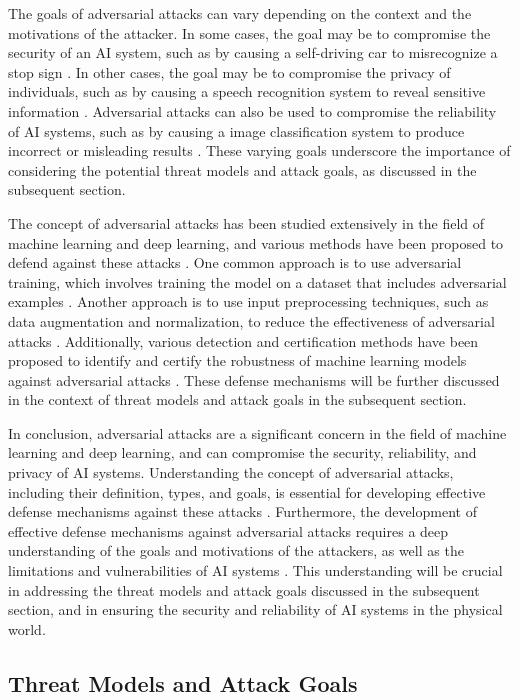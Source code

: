 \documentclass[11pt]{article}
\begin{document}
The goals of adversarial attacks can vary depending on the context and the motivations of the attacker. In some cases, the goal may be to compromise the security of an AI system, such as by causing a self-driving car to misrecognize a stop sign \cite{ref32}. In other cases, the goal may be to compromise the privacy of individuals, such as by causing a speech recognition system to reveal sensitive information \cite{ref28}. Adversarial attacks can also be used to compromise the reliability of AI systems, such as by causing a image classification system to produce incorrect or misleading results \cite{ref31}. These varying goals underscore the importance of considering the potential threat models and attack goals, as discussed in the subsequent section.

The concept of adversarial attacks has been studied extensively in the field of machine learning and deep learning, and various methods have been proposed to defend against these attacks \cite{ref33}. One common approach is to use adversarial training, which involves training the model on a dataset that includes adversarial examples \cite{ref34}. Another approach is to use input preprocessing techniques, such as data augmentation and normalization, to reduce the effectiveness of adversarial attacks \cite{ref35}. Additionally, various detection and certification methods have been proposed to identify and certify the robustness of machine learning models against adversarial attacks \cite{ref36}. These defense mechanisms will be further discussed in the context of threat models and attack goals in the subsequent section.

In conclusion, adversarial attacks are a significant concern in the field of machine learning and deep learning, and can compromise the security, reliability, and privacy of AI systems. Understanding the concept of adversarial attacks, including their definition, types, and goals, is essential for developing effective defense mechanisms against these attacks \cite{ref37}. Furthermore, the development of effective defense mechanisms against adversarial attacks requires a deep understanding of the goals and motivations of the attackers, as well as the limitations and vulnerabilities of AI systems \cite{ref38}. This understanding will be crucial in addressing the threat models and attack goals discussed in the subsequent section, and in ensuring the security and reliability of AI systems in the physical world.

\subsection{Threat Models and Attack Goals}
\end{document}
